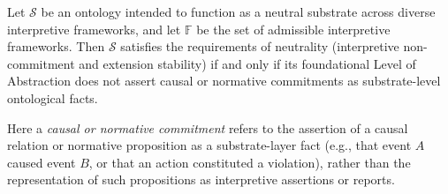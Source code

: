 \begin{theorem}
  \label{thm:neutrality}
  Let $\mathcal{S}$ be an ontology intended to function
  as a neutral substrate across diverse interpretive frameworks,
  and let $\mathbb{F}$ be the set of admissible interpretive frameworks.
  Then $\mathcal{S}$ satisfies the requirements of neutrality
  (interpretive non-commitment and extension stability)
  if and only if its foundational Level of Abstraction
  does not assert causal or normative commitments
  as substrate-level ontological facts.
\end{theorem}

Here a \emph{causal or normative commitment} refers to the assertion
of a causal relation or normative proposition as a substrate-layer fact
(e.g., that event $A$ caused event $B$, or that an action constituted a violation),
rather than the representation of such propositions as interpretive assertions or reports.

